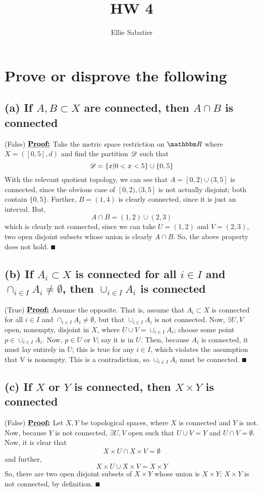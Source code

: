 \documentclass{article}
\author{Ellie Sabatier}
\title{HW 4}
\begin{document}
\section{Prove or disprove the following}
\subsection*{(a) If $A, B \subset X$ are connected, then $A \cap B$ is connected}
(False) $\textbf{\underline{Proof:}}$ Take the metric space restriction on $\R$ where $X = ([0, 5], d)$ and find the partition $\mathscr{D}$ such that
$$\mathscr{D} = \{x | 0 < x < 5\} \cup \{0, 5\}$$
With the relevant quotient topology, we can see that $A = [0, 2) \cup (3, 5]$ is connected, since the obvious case of $[0, 2), (3, 5]$ is not actually disjoint; both contain $\{0, 5\}$. Further, $B = (1, 4)$ is clearly connected, since it is just an interval. But, 
$$A \cap B = (1, 2) \cup (2, 3)$$
which is clearly not connected, since we can take $U = (1, 2)$ and $V = (2, 3)$, two open disjoint subsets whose union is clearly $A \cap B$. So, the above property does not hold. $\QED$

\subsection*{(b) If $A_i \subset X$ is connected for all $i \in I$ and $\cap_{i \in I}A_i \neq \emptyset$, then $\cup_{i \in I}A_i$ is connected}
(True) $\textbf{\underline{Proof:}}$ Assume the opposite. That is, assume that $A_i \subset X$ is connected for all $i \in I$ and $\cap_{i \in I}A_i \neq \emptyset$, but that $\cup_{i \in I}A_i$ is not connected. Now, $\exists U, V$ open, nonempty, disjoint in $X$, where $U \cup V = \cup_{i \in I}A_i$; choose some point $p \in \cup_{i \in I}A_i$. Now, $p \in U$ or $V$; say it is in $U$. Then, because $A_i$ is connected, it must lay entirely in $U$; this is true for any $i \in I$, which violates the assumption that V is nonempty. This is a contradiction, so  $\cup_{i \in I}A_i$ must be connected. $\QED$

\subsection*{(c) If $X$ or $Y$ is connected, then $X \times Y$ is connected}
(False) $\textbf{\underline{Proof:}}$ Let $X, Y$ be topological spaces, where $X$ is connected and $Y$ is not. Now, because $Y$ is not connected, $\exists U, V$ open such that $U \cup V = Y$ and $U \cap V = \emptyset$. Now, it is clear that
$$X \times U \cap X \times V = \emptyset$$
and further,
$$X \times U \cup X \times V = X \times Y$$
So, there are two open disjoint subsets of $X \times Y$ whose union is $X \times Y$; $X \times Y$ is not connected, by definition. $\QED$
\end{document}
